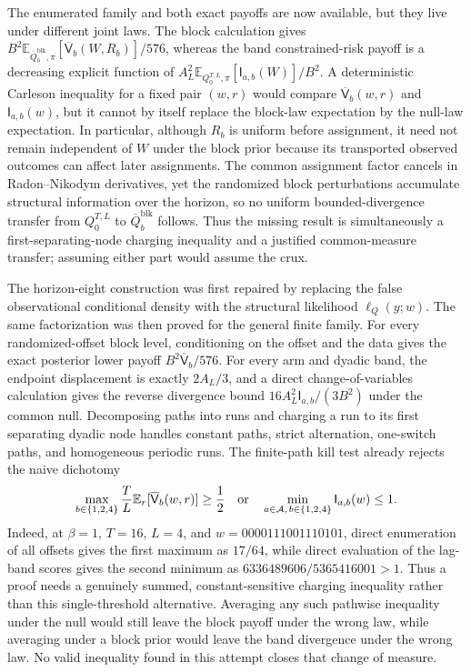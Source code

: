 The enumerated family and both exact payoffs are now available, but they live under different joint laws.  The block calculation gives \(B^2\mathbb E_{\overline Q_b^{\mathrm{blk}},\pi}[\overline{\mathsf V}_b(W,R_b)]/576\), whereas the band constrained-risk payoff is a decreasing explicit function of \(A_L^2\mathbb E_{Q_0^{T,L},\pi}[\mathsf I_{a,b}(W)]/B^2\).  A deterministic Carleson inequality for a fixed pair \((w,r)\) would compare \(\overline{\mathsf V}_b(w,r)\) and \(\mathsf I_{a,b}(w)\), but it cannot by itself replace the block-law expectation by the null-law expectation.  In particular, although \(R_b\) is uniform before assignment, it need not remain independent of \(W\) under the block prior because its transported observed outcomes can affect later assignments.  The common assignment factor cancels in Radon--Nikodym derivatives, yet the randomized block perturbations accumulate structural information over the horizon, so no uniform bounded-divergence transfer from \(Q_0^{T,L}\) to \(\overline Q_b^{\mathrm{blk}}\) follows.  Thus the missing result is simultaneously a first-separating-node charging inequality and a justified common-measure transfer; assuming either part would assume the crux.

The horizon-eight construction was first repaired by replacing the false observational conditional density with the structural likelihood \(\ell_Q(y;w)\).  The same factorization was then proved for the general finite family.  For every randomized-offset block level, conditioning on the offset and the data gives the exact posterior lower payoff \(B^2\overline{\mathsf V}_b/576\).  For every arm and dyadic band, the endpoint displacement is exactly \(2A_L/3\), and a direct change-of-variables calculation gives the reverse divergence bound \(16A_L^2\mathsf I_{a,b}/(3B^2)\) under the common null.  Decomposing paths into runs and charging a run to its first separating dyadic node handles constant paths, strict alternation, one-switch paths, and homogeneous periodic runs.  The finite-path kill test already rejects the naive dichotomy
\[
 \max_{b\in\{1,2,4\}}\frac{T}{L}
 \mathbb E_r[\overline{\mathsf V}_b(w,r)]\ge\frac12
 \quad\hbox{or}\quad
 \min_{a\in\mathcal A,\,b\in\{1,2,4\}}\mathsf I_{a,b}(w)\le1.
\]
Indeed, at \(\beta=1\), \(T=16\), \(L=4\), and \(w=0000111001110101\), direct enumeration of all offsets gives the first maximum as \(17/64\), while direct evaluation of the lag-band scores gives the second minimum as \(6336489606/5365416001>1\).  Thus a proof needs a genuinely summed, constant-sensitive charging inequality rather than this single-threshold alternative.  Averaging any such pathwise inequality under the null would still leave the block payoff under the wrong law, while averaging under a block prior would leave the band divergence under the wrong law.  No valid inequality found in this attempt closes that change of measure.

